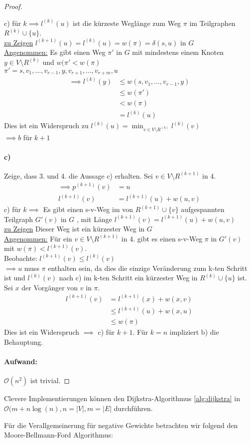 \begin{proof}
\begin{itemize}[label=$\lozenge$, itemsep=2ex]
c) für $k \implies l^{(k)}(u)$ ist die kürzeste Weglänge zum Weg $\pi$ im Teilgraphen $R^{(k)}\cup \{u\}$. \\
\underline{zu Zeigen} $l^{(k+1)}(u)=l^{(k)}(u)=w(\pi) = \delta(s,u)$ in $G$ \\
\underline{Angenommen:} Es gibt einen Weg $\pi'$ in $G$ mit mindestens einem Knoten $y \in V \setminus R^{(k)}$ und $w(\pi' < w(\pi)$ \\
$\pi' = s,v_1,\ldots,v_{r-1},y,v_{r+1},\ldots,v_{r+m},u$ \\
\begin{align*}
	\implies l^{(k)}(y) &\le  w(s,v_1,\ldots,v_{r-1},y) \\
			    &\le w(\pi') \\
			    &< w (\pi) \\
			    &= l^{(k)}(u)
\end{align*}
Dies ist ein Widerspruch zu $l^{(k)}(u)= \min_{v \in V \setminus R^{(k)}} l^{(k)}(v)$ \\
$\implies b$ für $k+1$
\end{itemize}
\paragraph{c)}
Zeige, dass 3. und 4. die Aussage c) erhalten. Sei $v \in V \setminus R^{(k+1)}$ in 4. \\
\begin{align*}
	\implies p^{(k+1)}(v)&= u \\
	l^{(k+1)}(v) &= l^{\left( k+1 \right)}(u) +w(u,v)
\end{align*}
c) für $k \implies $ Es gibt einen s-v-Weg im von $R^{(k+1)}\cup \{v\} $ aufgespannten Teilgraph $G'(v)$  in $G$ , mit Länge $l^{(k+1)}(v)= l^{(k+1)}(u)+w(u,v)$ \\
\underline{zu Zeigen} Dieser Weg ist ein kürzester Weg in $G$ \\
\underline{Angenommen:} Für ein $v \in V \setminus R^{(k+1)}$ in 4. gibt es einen s-v-Weg $\pi$ in $G'(v)$ mit $w(\pi) < l^{(k+1)}(v)$. \\
Beobachte: $l^{(k+1)}(v) \le l^{(k)}(v)$ \\
$\implies u$ muss $\pi$ enthalten sein, da dies die einzige Veränderung zum k-ten Schritt ist und $l^{(k)}(v)$ nach c) im k-ten Schritt ein kürzester Weg in $R^{(k)}\cup \{u\} $ ist. \\
Sei $x$ der Vorgänger von $v$  in $\pi$. 
\begin{align*}
	l^{(k+1)}(v)&= l^{(k+1)}(x) + w(x,v) \\
		    &\le l^{(k+1)}(u) + w(x,u) \\
		    &\le w(\pi)
\end{align*}
Dies ist ein Widerspruch $\implies $ c) für $k+1$. Für $k=n$ impliziert b) die Behauptung. 
\paragraph{Aufwand:} $\mathcal{O}(n^2)$ ist trivial. 
\end{proof}
\begin{remark}
Clevere Implementierungen können den Dijkstra-Algorithmus \ref{alg:dijkstra} in $\mathcal{O} (m+n\log(n), n=|V|, m=|E|$ durchführen.
\end{remark}
Für die Verallgemeinerung für negative Gewichte betrachten wir folgend den Moore-Bellmann-Ford Algorithmus:
